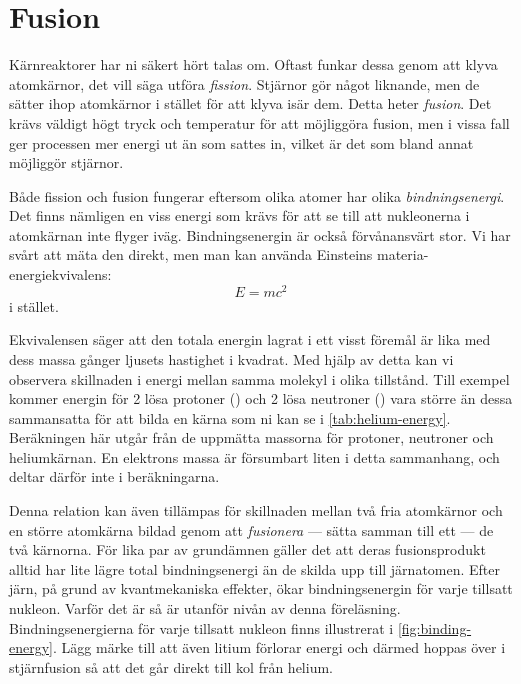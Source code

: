 \section{Fusion}
Kärnreaktorer har ni säkert hört talas om. Oftast funkar dessa genom att klyva atomkärnor, det vill säga utföra \emph{fission}. Stjärnor gör något liknande, men de sätter ihop atomkärnor i stället för att klyva isär dem. Detta heter \emph{fusion}. Det krävs väldigt högt tryck och temperatur för att möjliggöra fusion, men i vissa fall ger processen mer energi ut än som sattes in, vilket är det som bland annat möjliggör stjärnor.

Både fission och fusion fungerar eftersom olika atomer har olika \emph{bindningsenergi}. Det finns nämligen en viss energi som krävs för att se till att nukleonerna i atomkärnan inte flyger iväg. Bindningsenergin är också förvånansvärt stor. Vi har svårt att mäta den direkt, men man kan använda Einsteins materia-energiekvivalens:
\begin{equation}
    E = mc^2
    \label{eq:emc2}
\end{equation}
i stället.

Ekvivalensen säger att den totala energin lagrat i ett visst föremål är lika med dess massa gånger ljusets hastighet i kvadrat. Med hjälp av detta kan vi observera skillnaden i energi mellan samma molekyl i olika tillstånd. Till exempel kommer energin för 2 lösa protoner () och 2 lösa neutroner () vara större än dessa sammansatta för att bilda en  kärna som ni kan se i \cref{tab:helium-energy}. Beräkningen här utgår från de uppmätta massorna för protoner, neutroner och heliumkärnan. En elektrons massa är försumbart liten i detta sammanhang, och deltar därför inte i beräkningarna.

Denna relation kan även tillämpas för skillnaden mellan två fria atomkärnor och en större atomkärna bildad genom att \emph{fusionera} --- sätta samman till ett --- de två kärnorna. För lika par av grundämnen gäller det att deras fusionsprodukt alltid har lite lägre total bindningsenergi än de skilda upp till järnatomen. Efter järn, på grund av kvantmekaniska effekter, ökar bindningsenergin för varje tillsatt nukleon. Varför det är så är utanför nivån av denna föreläsning. Bindningsenergierna för varje tillsatt nukleon finns illustrerat i \cref{fig:binding-energy}. Lägg märke till att även litium förlorar energi och därmed hoppas över i stjärnfusion så att det går direkt till kol från helium.

